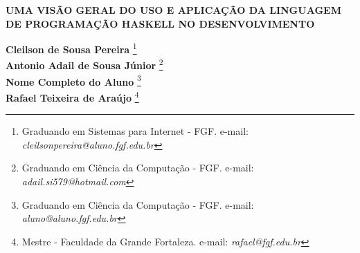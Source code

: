\documentclass[12pt]{article}
\begin{document}

%



\begin{center}
\textbf{\Large{UMA VISÃO GERAL DO USO E APLICAÇÃO DA LINGUAGEM DE PROGRAMAÇÃO HASKELL NO DESENVOLVIMENTO}}\\
\end{center}

\vspace*{0.2cm}

\begin{flushright}
 {\bf Cleilson de Sousa Pereira} \footnote[1]{Graduando em Sistemas para Internet - FGF. e-mail: \it cleilsonpereira@aluno.fgf.edu.br}  \\
 {\bf Antonio Adail de Sousa Júnior} \footnote[2]{Graduando em Ciência da Computação - FGF. e-mail: \it adail.si579@hotmail.com}  \\
  {\bf Nome Completo do Aluno} \footnote[3]{Graduando em Ciência da Computação - FGF. e-mail: \it aluno@aluno.fgf.edu.br}  \\
   {\bf Rafael Teixeira de Araújo} \footnote[4]{Mestre - Faculdade da Grande Fortaleza. e-mail: \it rafael@fgf.edu.br}   \\
\end{flushright}

\vspace*{0.5cm}

\end{document}
